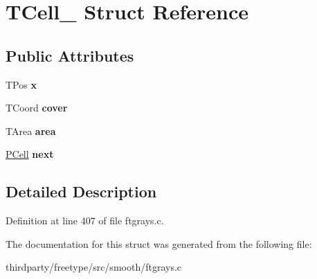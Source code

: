 \hypertarget{struct_t_cell__}{}\section{T\+Cell\+\_\+ Struct Reference}
\label{struct_t_cell__}
\subsection*{Public Attributes}
\begin{DoxyCompactItemize}
\item 
\mbox{\label{struct_t_cell___a3abdaea7ea20fd5206bbc3ffbb8fefe0}} 
T\+Pos {\bfseries x}
\item 
\mbox{\label{struct_t_cell___a28686cf9daed2749bd5a6efda14a9843}} 
T\+Coord {\bfseries cover}
\item 
\mbox{\label{struct_t_cell___af7ad708f810a148a0303bb851f82fe7b}} 
T\+Area {\bfseries area}
\item 
\mbox{\label{struct_t_cell___a2b668ed32d6a79702931eb7f78f4b2d6}} 
\hyperlink{struct_t_cell__}{P\+Cell} {\bfseries next}
\end{DoxyCompactItemize}


\subsection{Detailed Description}


Definition at line 407 of file ftgrays.\+c.



The documentation for this struct was generated from the following file\+:\begin{DoxyCompactItemize}
\item 
thirdparty/freetype/src/smooth/ftgrays.\+c\end{DoxyCompactItemize}
